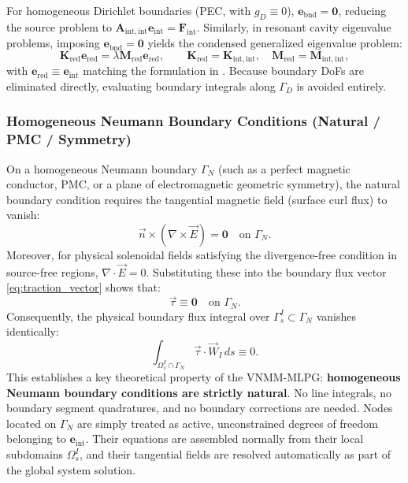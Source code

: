 \documentclass[preprint,12pt]{elsarticle}
\begin{document}
For homogeneous Dirichlet boundaries (PEC, with $g_D \equiv 0$), $\mathbf{e}_{\mathrm{bnd}} = \mathbf{0}$, reducing the source problem to $\mathbf{A}_{\mathrm{int}, \mathrm{int}} \mathbf{e}_{\mathrm{int}} = \mathbf{F}_{\mathrm{int}}$. Similarly, in resonant cavity eigenvalue problems, imposing $\mathbf{e}_{\mathrm{bnd}} = \mathbf{0}$ yields the condensed generalized eigenvalue problem:
\begin{equation}
    \mathbf{K}_{\mathrm{red}} \mathbf{e}_{\mathrm{red}} = \lambda \mathbf{M}_{\mathrm{red}} \mathbf{e}_{\mathrm{red}}, \qquad \mathbf{K}_{\mathrm{red}} = \mathbf{K}_{\mathrm{int}, \mathrm{int}}, \quad \mathbf{M}_{\mathrm{red}} = \mathbf{M}_{\mathrm{int}, \mathrm{int}},
    \label{eq:reduced_eigenproblem}
\end{equation}
with $\mathbf{e}_{\mathrm{red}} \equiv \mathbf{e}_{\mathrm{int}}$ matching the formulation in \cite{stable_vnmm2d_2026}.
Because boundary DoFs are eliminated directly, evaluating boundary integrals along $\Gamma_D$ is avoided entirely.

\subsubsection{Homogeneous Neumann Boundary Conditions (Natural / PMC / Symmetry)}
\label{subsubsec:neumann_homogeneous}

On a homogeneous Neumann boundary $\Gamma_N$ (such as a perfect magnetic conductor, PMC, or a plane of electromagnetic geometric symmetry), the natural boundary condition requires the tangential magnetic field (surface curl flux) to vanish:
\begin{equation}
    \vec{n} \times (\nabla \times \vec{E}) = \mathbf{0} \quad \text{on } \Gamma_N.
    \label{eq:neumann_homogeneous_pde}
\end{equation}
Moreover, for physical solenoidal fields satisfying the divergence-free condition in source-free regions, $\nabla \cdot \vec{E} = 0$. Substituting these into the boundary flux vector \eqref{eq:traction_vector} shows that:
\begin{equation}
    \vec{\tau} \equiv \mathbf{0} \quad \text{on } \Gamma_N.
\end{equation}
Consequently, the physical boundary flux integral over $\Gamma_s^I \subset \Gamma_N$ vanishes identically:
\begin{equation}
    \int_{\Omega_s^I \cap \Gamma_N} \vec{\tau} \cdot \vec{W}_I \, ds \equiv 0.
\end{equation}
This establishes a key theoretical property of the VNMM-MLPG: \textbf{homogeneous Neumann boundary conditions are strictly natural}. No line integrals, no boundary segment quadratures, and no boundary corrections are needed. Nodes located on $\Gamma_N$ are simply treated as active, unconstrained degrees of freedom belonging to $\mathbf{e}_{\mathrm{int}}$. Their equations are assembled normally from their local subdomains $\Omega_s^I$, and their tangential fields are resolved automatically as part of the global system solution.
\end{document}
